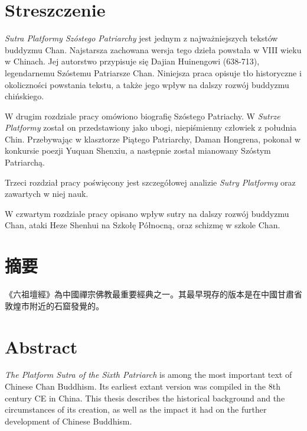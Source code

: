 \makeatletter
\@openrightfalse
\makeatother
\chapter*{Streszczenie}
\textit{Sutra Platformy Szóstego Patriarchy} jest jednym z najważniejszych tekstów buddyzmu Chan.
Najstarsza zachowana wersja tego dzieła powstała w VIII wieku w Chinach.
Jej autorstwo przypisuje się Dajian Huinengowi (638-713), legendarnemu Szóstemu Patriarsze Chan.
Niniejsza praca opisuje tło historyczne i okoliczności powstania tekstu, a także jego wpływ na dalszy rozwój buddyzmu chińskiego.

W drugim rozdziale pracy omówiono biografię Szóstego Patriachy.
W \textit{Sutrze Platformy} został on przedstawiony jako ubogi, niepiśmienny człowiek z południa Chin.
Przebywając w klasztorze Piątego Patriarchy, Daman Hongrena, pokonał w konkursie poezji Yuquan Shenxiu, a następnie został mianowany Szóstym Patriarchą.

Trzeci rozdział pracy poświęcony jest szczegółowej analizie \textit{Sutry Platformy} oraz zawartych w niej nauk.

W czwartym rozdziale pracy opisano wpływ sutry na dalszy rozwój buddyzmu Chan, ataki Heze Shenhui na Szkołę Północną, oraz schizmę w szkole Chan.

\chapter*{摘要}
《六祖壇經》為中國禪宗佛教最重要經典之一。其最早現存的版本是在中國甘肅省敦煌市附近的石窟發覺的。

\chapter*{Abstract}
\textit{The Platform Sutra of the Sixth Patriarch} is among the most important text of Chinese Chan Buddhism.
Its earliest extant version was compiled in the 8th century CE in China.
This thesis describes the historical background and the circumstances of its creation, as well as the impact it had on the further development of Chinese Buddhism.
